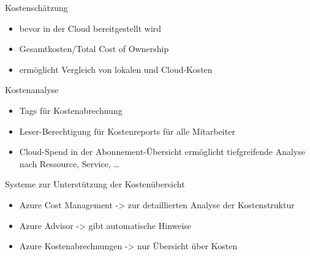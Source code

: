 

\begin{flashcard}[Definition]{Kostenschätzung}
  \begin{itemize}
    \item bevor in der Cloud bereitgestellt wird
    \item Gesamtkosten/Total Cost of Ownership
    \item ermöglicht Vergleich von lokalen und Cloud-Kosten
  \end{itemize}
\end{flashcard}

\begin{flashcard}[Definition]{Kostenanalyse}
  \begin{itemize}
    \item Tags für Kostenabrechnung
    \item Leser-Berechtigung für Kostenreports für alle Mitarbeiter
    \item Cloud-Spend in der Abonnement-Übersicht\newline
      ermöglicht tiefgreifende Analyse nach Ressource, Service, \ldots
  \end{itemize}
\end{flashcard}

\begin{flashcard}[Definition]{Systeme zur Unterstützung der Kostenübersicht}
  \begin{itemize}
    \item Azure Cost Management -> zur detaillierten Analyse der Kostenstruktur
    \item Azure Advisor -> gibt automatische Hinweise
    \item Azure Kostenabrechnungen -> nur Übersicht über Kosten
  \end{itemize}
\end{flashcard}


